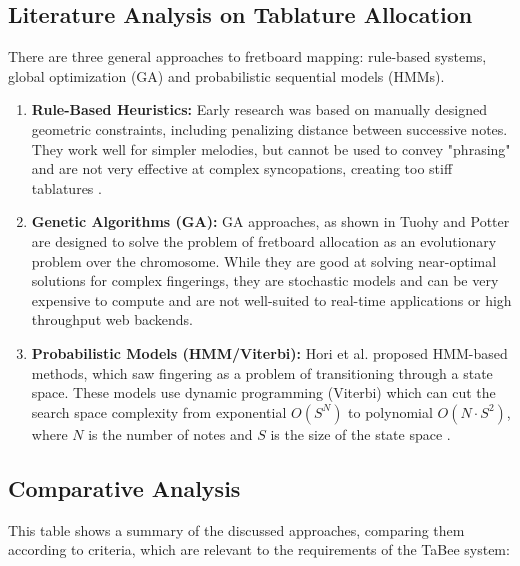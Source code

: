 \documentclass[a4paper, 12pt, titlepage]{article}
\begin{document}
\subsection{Literature Analysis on Tablature Allocation}
There are three general approaches to fretboard mapping: rule-based systems, global optimization (GA) and probabilistic sequential models (HMMs).

\begin{enumerate}
    \item \textbf{Rule-Based Heuristics:} Early research was based on manually designed geometric constraints, including penalizing distance between successive notes. They work well for simpler melodies, but cannot be used to convey "phrasing" and are not very effective at complex syncopations, creating too stiff tablatures \cite{sayegh1989,raphael2004,radicioni2005}.
    
    \item \textbf{Genetic Algorithms (GA):} GA approaches, as shown in Tuohy and Potter \cite{tuohy2005ga} are designed to solve the problem of fretboard allocation as an evolutionary problem over the chromosome. While they are good at solving near-optimal solutions for complex fingerings, they are stochastic models and can be very expensive to compute and are not well-suited to real-time applications or high throughput web backends.
    
    \item \textbf{Probabilistic Models (HMM/Viterbi):} Hori et al. \cite{hori2013} proposed HMM-based methods, which saw fingering as a problem of transitioning through a state space. These models use dynamic programming (Viterbi) which can cut the search space complexity from exponential $O(S^N)$ to polynomial $O(N \cdot S^2)$, where $N$ is the number of notes and $S$ is the size of the state space \cite{forney1973,rabiner1989}.

\end{enumerate}

\subsection{Comparative Analysis}
This table shows a summary of the discussed approaches, comparing them according to criteria, which are relevant to the requirements of the TaBee system:
\end{document}
